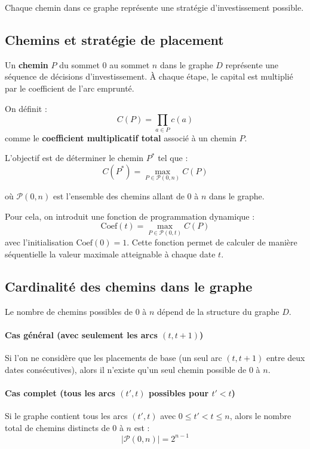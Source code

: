 \documentclass[a4paper,11pt]{article}
\begin{document}
Chaque chemin dans ce graphe représente une stratégie d’investissement possible.


\subsection{Chemins et stratégie de placement}

Un \textbf{chemin} $P$ du sommet $0$ au sommet $n$ dans le graphe $D$ représente une séquence de décisions d’investissement. À chaque étape, le capital est multiplié par le coefficient de l’arc emprunté.

On définit :
\[
	C(P) = \prod_{a \in P} c(a)
\]
\indent comme le \textbf{coefficient multiplicatif total} associé à un chemin $P$.

L’objectif est de déterminer le chemin $P^*$ tel que :
\[
	C(P^*) = \max_{P \in \mathcal{P}(0, n)} C(P)
\]

où $\mathcal{P}(0, n)$ est l’ensemble des chemins allant de 0 à $n$ dans le graphe.

Pour cela, on introduit une fonction de programmation dynamique :
\[
	\text{Coef}(t) = \max_{P \in \mathcal{P}(0, t)} C(P)
\]
avec l’initialisation $\text{Coef}(0) = 1$. Cette fonction permet de calculer de manière séquentielle la valeur maximale atteignable à chaque date $t$.

\subsection{Cardinalité des chemins dans le graphe}

Le nombre de chemins possibles de 0 à $n$ dépend de la structure du graphe $D$.

\paragraph{Cas général (avec seulement les arcs $(t, t+1)$)} 
Si l’on ne considère que les placements de base (un seul arc $(t, t+1)$ entre deux dates consécutives), alors il n’existe qu’un seul chemin possible de 0 à $n$.

\paragraph{Cas complet (tous les arcs $(t', t)$ possibles pour $t' < t$)} 
Si le graphe contient tous les arcs $(t', t)$ avec $0 \leq t' < t \leq n$, alors le nombre total de chemins distincts de $0$ à $n$ est :
\[
	|\mathcal{P}(0, n)| = 2^{n-1}
\]
\end{document}
